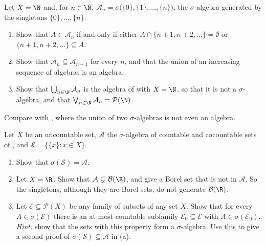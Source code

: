 \begin{exercise}\label{ex:sa-increasing-union}
\easy Let $X=\N$ and, for $n\in\N$, $\mathcal A_n=\sigma\big(\{0\},\{1\},\dots,\{n\}\big)$, the
$\sigma$-algebra generated by the singletons $\{0\},\dots,\{n\}$.
\begin{enumerate}[label=(\alph*)]
  \item Show that $A\in\mathcal A_n$ if and only if either $A\cap\{n+1,n+2,\dots\}=\emptyset$ or
    $\{n+1,n+2,\dots\}\subseteq A$.
  \item Show that $\mathcal A_n\subseteq\mathcal A_{n+1}$ for every $n$, and that the union of an
    increasing sequence of algebras is an algebra.
  \item Show that $\bigcup_{n\in\N}\mathcal A_n$ is the algebra of
     with $X=\N$, so that it is not a $\sigma$-algebra, and that
    $\bigvee_{n\in\N}\mathcal A_n=\mathcal P(\N)$.
\end{enumerate}
Compare with , where the union of two $\sigma$-algebras is not even
an algebra.
\end{exercise}

\begin{exercise}\label{ex:sa-countable-singletons}
\medium Let $X$ be an uncountable set, $\mathcal A$ the $\sigma$-algebra of countable and
cocountable sets of , and $\mathcal S=\{\{x\}:x\in X\}$.
\begin{enumerate}[label=(\alph*)]
  \item Show that $\sigma(\mathcal S)=\mathcal A$.
  \item Let $X=\R$. Show that $\mathcal A\subsetneq\mathcal B(\R)$, and give a Borel set that is
    not in $\mathcal A$. So the singletons, although they are Borel sets, do not generate
    $\mathcal B(\R)$.
  \item Let $\mathcal E\subseteq\mathcal P(X)$ be any family of subsets of any set $X$. Show that
    for every $A\in\sigma(\mathcal E)$ there is an at most countable subfamily
    $\mathcal E_0\subseteq\mathcal E$ with $A\in\sigma(\mathcal E_0)$. \emph{Hint:} show that the
    sets with this property form a $\sigma$-algebra. Use this to give a second proof of
    $\sigma(\mathcal S)\subseteq\mathcal A$ in (a).
\end{enumerate}
\end{exercise}

